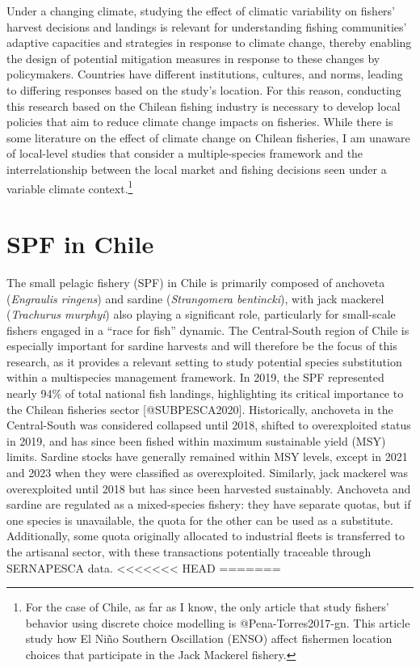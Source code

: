 Under a changing climate, studying the effect of climatic variability on
fishers' harvest decisions and landings is relevant for understanding
fishing communities' adaptive capacities and strategies in response to
climate change, thereby enabling the design of potential mitigation
measures in response to these changes by policymakers. Countries have
different institutions, cultures, and norms, leading to differing
responses based on the study's location. For this reason, conducting
this research based on the Chilean fishing industry is necessary to
develop local policies that aim to reduce climate change impacts on
fisheries. While there is some literature on the effect of climate
change on Chilean fisheries, I am unaware of local-level studies that
consider a multiple-species framework and the interrelationship between
the local market and fishing decisions seen under a variable climate
context.\footnote{For the case of Chile, as far as I know, the only
  article that study fishers' behavior using discrete choice modelling
  is @Pena-Torres2017-gn. This article study how El Niño Southern
  Oscillation (ENSO) affect fishermen location choices that participate
  in the Jack Mackerel fishery.}

\hypertarget{spf-in-chile}{%
\section{SPF in Chile}\label{spf-in-chile}}

The small pelagic fishery (SPF) in Chile is primarily composed of
anchoveta (\emph{Engraulis ringens}) and sardine (\emph{Strangomera
bentincki}), with jack mackerel (\emph{Trachurus murphyi}) also playing
a significant role, particularly for small-scale fishers engaged in a
``race for fish'' dynamic. The Central-South region of Chile is
especially important for sardine harvests and will therefore be the
focus of this research, as it provides a relevant setting to study
potential species substitution within a multispecies management
framework. In 2019, the SPF represented nearly 94\% of total national
fish landings, highlighting its critical importance to the Chilean
fisheries sector {[}@SUBPESCA2020{]}. Historically, anchoveta in the
Central-South was considered collapsed until 2018, shifted to
overexploited status in 2019, and has since been fished within maximum
sustainable yield (MSY) limits. Sardine stocks have generally remained
within MSY levels, except in 2021 and 2023 when they were classified as
overexploited. Similarly, jack mackerel was overexploited until 2018 but
has since been harvested sustainably. Anchoveta and sardine are
regulated as a mixed-species fishery: they have separate quotas, but if
one species is unavailable, the quota for the other can be used as a
substitute. Additionally, some quota originally allocated to industrial
fleets is transferred to the artisanal sector, with these transactions
potentially traceable through SERNAPESCA data.
\textless\textless\textless\textless\textless\textless\textless{} HEAD
=======

